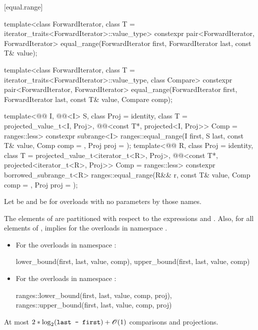 [equal.range]{}

%
\begin{itemdecl}
template<class ForwardIterator, class T = iterator_traits<ForwardIterator>::value_type>
  constexpr pair<ForwardIterator, ForwardIterator>
    equal_range(ForwardIterator first,
                ForwardIterator last, const T& value);

template<class ForwardIterator, class T = iterator_traits<ForwardIterator>::value_type,
         class Compare>
  constexpr pair<ForwardIterator, ForwardIterator>
    equal_range(ForwardIterator first,
                ForwardIterator last, const T& value,
                Compare comp);

template<@@ I, @@<I> S, class Proj = identity,
         class T = projected_value_t<I, Proj>,
         @@<const T*, projected<I, Proj>> Comp = ranges::less>
  constexpr subrange<I>
    ranges::equal_range(I first, S last, const T& value, Comp comp = {}, Proj proj = {});
template<@@ R, class Proj = identity,
         class T = projected_value_t<iterator_t<R>, Proj>,
         @@<const T*, projected<iterator_t<R>, Proj>> Comp =
           ranges::less>
  constexpr borrowed_subrange_t<R>
    ranges::equal_range(R&& r, const T& value, Comp comp = {}, Proj proj = {});
\end{itemdecl}

\begin{itemdescr}
\pnum
Let  be  and
 be 
for overloads with no parameters by those names.

\pnum
\expects
The elements  of 
are partitioned with respect to the expressions
 and
.
Also, for all elements  of ,
 implies 
for the overloads in namespace .

\pnum
\returns
\begin{itemize}
\item
For the overloads in namespace :
\begin{codeblock}
{lower_bound(first, last, value, comp),
 upper_bound(first, last, value, comp)}
\end{codeblock}
\item
For the overloads in namespace :
\begin{codeblock}
{ranges::lower_bound(first, last, value, comp, proj),
 ranges::upper_bound(first, last, value, comp, proj)}
\end{codeblock}
\end{itemize}

\pnum
\complexity
At most
$2 * \log_2(\tcode{last - first}) + \bigoh{1}$ comparisons and projections.
\end{itemdescr}

